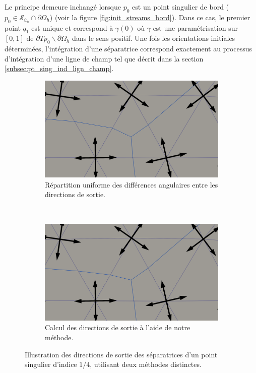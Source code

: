 Le principe demeure inchangé lorsque $p_0$ est un point singulier de bord ($p_0\in\mathcal{S}_{\bar{u}_h}\cap\partial\Omega_h$) (voir la figure \ref{fig:init_streams_bord}). Dans ce cas, le premier point $q_1$ est unique et correspond à $\gamma(0)$ où $\gamma$ est une paramétrisation sur $[0, 1]$ de $\partial T{p_0}\backslash\partial\Omega_h$ dans le sens positif. Une fois les orientations initiales déterminées, l'intégration d'une séparatrice correspond exactement au processus d'intégration d'une ligne de champ tel que décrit dans la section \ref{subsec:pt_sing_ind_lign_champ}.

\begin{figure}[h!]
\centering
\begin{subfigure}[b]{0.7\textwidth}
    \centering
    \includegraphics[width=\textwidth]{images/depart_sepa_1.pdf}
    \caption{Répartition uniforme des différences angulaires entre les directions de sortie.}
\end{subfigure}
\\[0.5cm]
\begin{subfigure}[b]{0.7\textwidth}
    \centering
    \includegraphics[width=\textwidth]{images/depart_sepa_2.pdf}
    \caption{Calcul des directions de sortie à l'aide de notre méthode.}
\end{subfigure}
\caption{Illustration des directions de sortie des séparatrices d'un point singulier d'indice $1/4$, utilisant deux méthodes distinctes.}
\label{fig:first_dir}
\end{figure}

